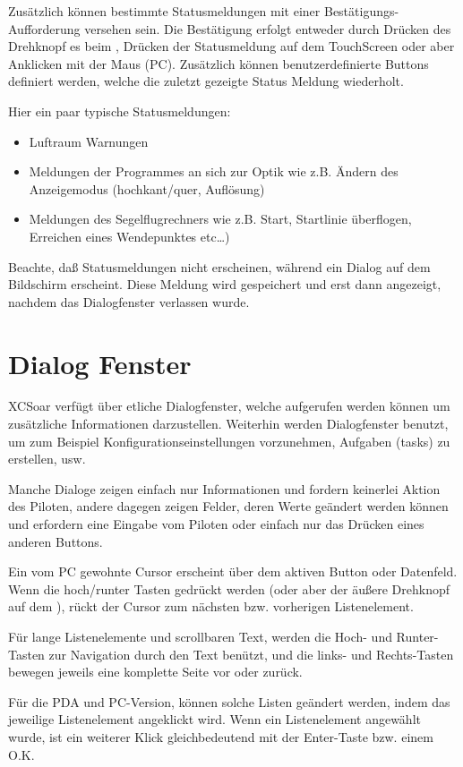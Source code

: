 Zusätzlich können bestimmte Statusmeldungen mit einer Bestätigungs-Aufforderung versehen sein.
Die Bestätigung erfolgt entweder durch Drücken des Drehknopf es beim \al, Drücken der Statusmeldung auf dem TouchScreen oder aber Anklicken mit der Maus (\textsf{PC}).  Zusätzlich können benutzerdefinierte Buttons definiert werden, welche die zuletzt gezeigte Status Meldung wiederholt.

Hier ein paar typische Statusmeldungen:
\begin{itemize}
\item Luftraum Warnungen
\item Meldungen der Programmes an sich zur Optik wie z.B. Ändern des Anzeigemodus (hochkant/quer, Auflösung)
\item Meldungen des Segelflugrechners wie z.B. Start, Startlinie überflogen, Erreichen eines Wendepunktes etc\dots  )
\end{itemize}

Beachte, daß Statusmeldungen nicht erscheinen, während ein Dialog auf dem Bildschirm erscheint. Diese Meldung wird gespeichert und erst dann angezeigt, nachdem das Dialogfenster verlassen wurde.

\section{Dialog Fenster}\label{sec:dialog-windows}

\textsf{XCSoar} verfügt über etliche Dialogfenster, welche aufgerufen werden können um zusätzliche Informationen darzustellen. Weiterhin werden Dialogfenster benutzt, um zum Beispiel Konfigurationseinstellungen vorzunehmen, Aufgaben (tasks) zu erstellen, usw.\

Manche Dialoge zeigen einfach nur Informationen und fordern keinerlei Aktion des Piloten, andere dagegen zeigen Felder, deren Werte geändert werden können und erfordern eine Eingabe vom Piloten oder einfach nur das Drücken eines anderen Buttons.

Ein vom \textsf{PC} gewohnte Cursor erscheint über dem aktiven Button oder Datenfeld.
Wenn die hoch/runter Tasten gedrückt werden (oder aber der äußere Drehknopf auf dem \al), rückt der Cursor zum nächsten bzw. vorherigen Listenelement.

Für lange Listenelemente und scrollbaren Text, werden die Hoch- und Runter-Tasten zur Navigation durch den Text benützt, und die links- und Rechts-Tasten bewegen jeweils eine komplette Seite vor oder zurück.

Für die PDA und \textsf{PC}-Version, können solche Listen geändert werden, indem das jeweilige Listenelement angeklickt wird.
Wenn ein Listenelement angewählt wurde, ist ein weiterer Klick gleichbedeutend mit der Enter-Taste bzw. einem O.K.


